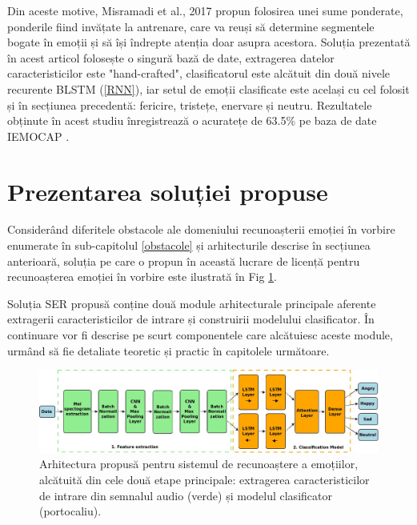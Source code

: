 \documentclass[a4paper,12pt]{book}
\newcounter{Figcount}
\begin{document}
					 Din aceste motive, Misramadi et al., 2017 \cite{misramadi} propun folosirea unei sume ponderate, ponderile fiind invățate la antrenare, care va reuși să determine segmentele bogate în emoții și să își îndrepte atenția doar asupra acestora. 					 
					 Soluția prezentată în acest articol folosește o singură bază de date, extragerea datelor caracteristicilor este "hand-crafted", clasificatorul este alcătuit din două nivele recurente BLSTM (\ref{RNN}), iar setul de emoții clasificate este același cu cel folosit și în secțiunea precedentă: fericire, tristețe, enervare și neutru. Rezultatele obținute în acest studiu înregistrează
					 o acuratețe de 63.5\% pe baza de date IEMOCAP \cite{iemocap}.
					 
				\section{Prezentarea soluției propuse} \label{solutie}
					Considerând diferitele obstacole ale domeniului recunoașterii emoției în vorbire enumerate în sub-capitolul \ref{obstacole} și arhitecturile descrise în secțiunea anterioară, soluția pe care o propun în această lucrare de licență pentru recunoașterea emoției în vorbire este ilustrată în Fig \ref{fig:model}. \par
					Soluția SER propusă conține două module arhitecturale principale aferente extragerii caracteristicilor de intrare și construirii modelului clasificator. În continuare vor fi descrise pe scurt componentele care alcătuiesc aceste module, urmând să fie detaliate teoretic și practic în capitolele următoare. \par
						
					
					\begin{figure}[t]
						\noindent
						\hspace*{-1cm}
						\includegraphics[scale=0.290]{Sistem_Diagram}
						\caption{Arhitectura propusă pentru sistemul de recunoaștere a emoțiilor, alcătuită din cele două etape principale: extragerea caracteristicilor de intrare din semnalul audio (verde) și modelul clasificator (portocaliu).}
						\label{fig:model}
						
					\end{figure}
				
\end{document}
